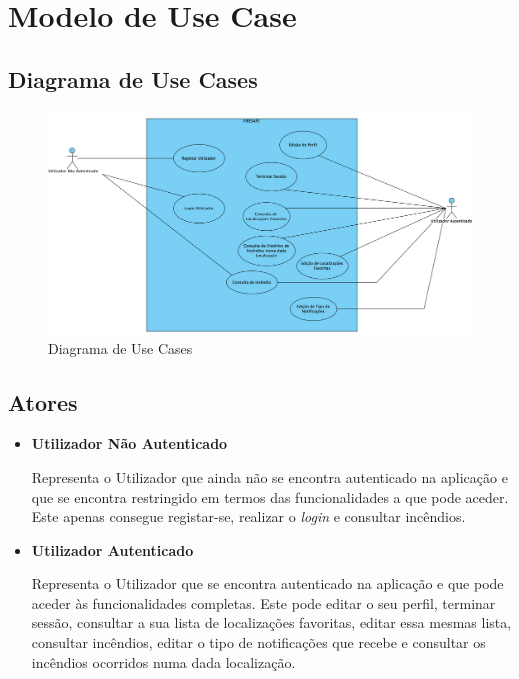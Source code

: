 \documentclass[a4paper,12pt]{scrreprt}
\begin{document}
\chapter{Modelo de Use Case}

\section{Diagrama de Use Cases}

\begin{figure}[H]
    \centering
    \includegraphics[width=.9\textwidth]{images/Fase2/04.ModeloDeUseCase/diagramaUseCases.png}
    \caption{Diagrama de Use Cases}
\end{figure}

\section{Atores}

\begin{itemize}
    \item \textbf{Utilizador Não Autenticado}
    
    Representa o Utilizador que ainda não se encontra autenticado na aplicação e que se encontra restringido em termos das funcionalidades a que pode aceder. Este apenas consegue registar-se, realizar o \textit{login} e consultar incêndios.
    
    \item \textbf{Utilizador Autenticado}
    
    Representa o Utilizador que se encontra autenticado na aplicação e que pode aceder às funcionalidades completas. Este pode editar o seu perfil, terminar sessão, consultar a sua lista de localizações favoritas, editar essa mesmas lista, consultar incêndios,  editar o tipo de notificações que recebe e consultar os incêndios ocorridos numa dada localização.
    
\end{itemize}
\end{document}
